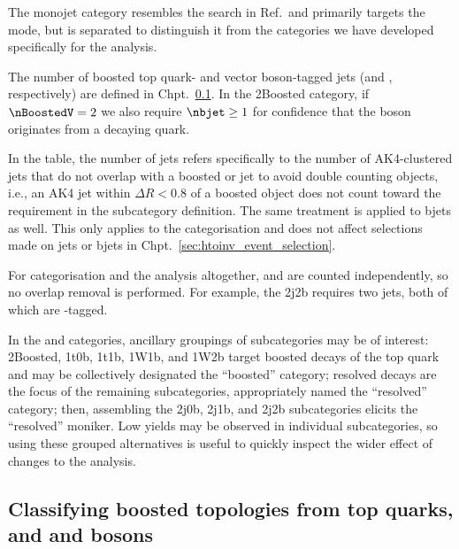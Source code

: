 The monojet category resembles the search in Ref.~and primarily targets the \ggF mode, but is separated to distinguish it from the categories we have developed specifically for the analysis.

The number of boosted top quark- and vector boson-tagged \glspl{jet} (\nBoostedTop and \nBoostedV, respectively) are defined in Chpt.~\ref{subsec:htoinv_deepak8}. In the \ttH 2Boosted category, if $\nBoostedV = \text{2}$ we also require $\nbjet \geq \text{1}$ for confidence that the \PVec boson originates from a decaying \Ptop quark.

In the table, the number of \glspl{jet} \njet refers specifically to the number of AK4-clustered \glspl{jet} that do not overlap with a boosted \Ptop or \PVec \gls{jet} to avoid double counting objects, i.e., an AK4 \gls{jet} within $\Delta R < \text{0.8}$ of a boosted object does not count toward the \njet requirement in the subcategory definition. The same treatment is applied to \glspl{bjet} as well. This only applies to the categorisation and does not affect selections made on \glspl{jet} or \glspl{bjet} in Chpt.~\ref{sec:htoinv_event_selection}.

For categorisation and the analysis altogether, \njet and \nbjet are counted independently, so no overlap removal is performed. For example, the \VH 2j2b requires two \glspl{jet}, both of which are \Pbottom-tagged.

In the \ttH and \VH categories, ancillary groupings of subcategories may be of interest: 2Boosted, 1t0b, 1t1b, 1W1b, and 1W2b target boosted decays of the top quark and may be collectively designated the ``\ttH boosted'' category; resolved decays are the focus of the remaining subcategories, appropriately named the ``\ttH resolved'' category; then, assembling the 2j0b, 2j1b, and 2j2b \VH subcategories elicits the ``\VH resolved'' moniker. Low yields may be observed in individual subcategories, so using these grouped alternatives is useful to quickly inspect the wider effect of changes to the analysis.




\subsection{Classifying boosted topologies from top quarks, and \texorpdfstring{\PW}{W} and \texorpdfstring{\PZ}{Z} bosons}
\label{subsec:htoinv_deepak8}

